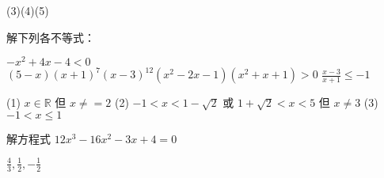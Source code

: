 \begin{QUESTIONS}
\begin{QUESTION}
    \begin{QTAGS} \end{QTAGS}
    \begin{QANS}
        (3)(4)(5)
    \end{QANS}
    \begin{QSOL}
    \end{QSOL}
    \begin{QEMPTYSPACE}
    \end{QEMPTYSPACE}
\end{QUESTION}
\begin{QUESTION}
    \begin{QBODY}
        解下列各不等式：
        \begin{SUBQLIST}
            \SUBQ $-{{x}^{2}}+4x-4<0$
            \SUBQ $\left( 5-x \right){{\left( x+1 \right)}^{7}}{{\left( x-3 \right)}^{12}}\left( {{x}^{2}}-2x-1 \right)\left( {{x}^{2}}+x+1 \right)>0$
            \SUBQ $\frac{x-3}{x+1}\le -1$
        \end{SUBQLIST}
    \end{QBODY}
    \begin{QFROMS}
    \end{QFROMS}
    \begin{QTAGS} \end{QTAGS}
    \begin{QANS}
        (1) $x \in \mathbb{R} $ 但 $x \ne =2 $
        (2) $-1<x<1-\sqrt{2}$ 或 $1+\sqrt{2} <x<5$ 但 $x\ne3$
        (3) $-1<x\le 1$
    \end{QANS}
    \begin{QSOL}
    \end{QSOL}
    \begin{QEMPTYSPACE}
    \end{QEMPTYSPACE}
\end{QUESTION}
\begin{QUESTION}
    \begin{QBODY}
        解方程式 $12{{x}^{3}}-16{{x}^{2}}-3x+4=0$
    \end{QBODY}
    \begin{QFROMS}
    \end{QFROMS}
    \begin{QTAGS} \end{QTAGS}
    \begin{QANS}
        $\frac{4}{3}, \frac{1}{2}, -\frac{1}{2}$
    \end{QANS}
    \begin{QSOL}
    \end{QSOL}

\end{QUESTION}
\end{QUESTIONS}
